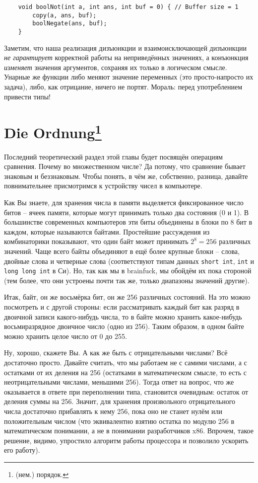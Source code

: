 \documentclass{book}
\begin{document}
\begin{verbatim}
    void boolNot(int a, int ans, int buf = 0) { // Buffer size = 1
        copy(a, ans, buf);
        boolNegate(ans, buf);
    }
\end{verbatim}

Заметим, что наша реализация дизъюнкции и взаимоисключающей дизъюнкции {\em не гарантирует} корректной
работы на неприведённых значениях, а конъюнкция {\em изменяет} значения аргументов, сохраняя их только в логическом
смысле. Унарные же функции либо меняют значение переменных (это просто-напросто их задача), либо, как отрицание,
ничего не портят. Мораль: перед употреблением привести типы!

\section[Die Ordnung]{Die Ordnung\protect\footnote{(нем.) порядок.}}

Последний теоретический раздел этой главы будет посвящён операциям сравнения. Почему во множественном числе? Да
потому, что сравнение бывает знаковым и беззнаковым. Чтобы понять, в чём же, собственно, разница, давайте
повнимательнее присмотримся к устройству чисел в компьютере.

Как Вы знаете, для хранения числа в памяти выделяется фиксированное число битов -- ячеек памяти, которые могут
принимать только два состояния (0 и 1). В большинстве современных компьютеров эти биты объединены в блоки по 8 бит
в каждом, которые называются байтами. Простейшие рассуждения из комбинаторики показывают, что один байт может
принимать $2^8 = 256$ различных значений. Чаще всего байты объединяют в ещё более крупные блоки -- слова, двойные
слова и четверные слова (соответствуют типам данных \texttt{short int}, \texttt{int} и \texttt{long long int} в Си).
Но, так как мы в brainfuck, мы обойдём их пока стороной (тем более, что они устроены почти так же, только диапазоны
значений другие).

Итак, байт, он же восьмёрка бит, он же 256 различных состояний. На это можно посмотреть и с другой стороны: если
рассматривать каждый бит как разряд в двоичной записи какого-нибудь числа, то в байте можно хранить какое-нибудь
восьмиразрядное двоичное число (одно из 256). Таким образом, в одном байте можно хранить целое число от 0 до 255.

Ну, хорошо, скажете Вы. А как же быть с отрицательными числами? Всё достаточно просто. Давайте считать, что мы
работаем не с самими числами, а с остатками от их деления на 256 (остатками в математическом смысле, то есть с
неотрицательными числами, меньшими 256). Тогда ответ на вопрос, что же оказывается в ответе при переполнении типа,
становится очевидным: остаток от деления суммы на 256. Значит, для хранения произвольного отрицательного числа
достаточно прибавлять к нему 256, пока оно не станет нулём или положительным числом (что эквивалентно взятию
остатка по модулю 256 в математическом понимании, а не в понимании разработчиков x86. Впрочем, такое решение,
видимо, упростило алгоритм работы процессора и позволило ускорить его работу).
\end{document}

